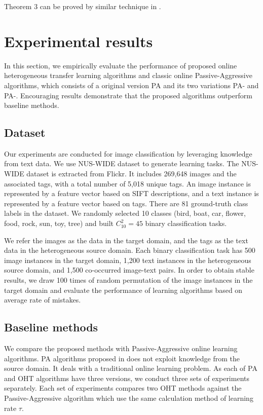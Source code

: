 \documentclass{article} %
\theoremstyle{remark}
\theoremstyle{definition}
\begin{document}
Theorem 3 can be proved by similar technique in \cite{1997decisionFreund}.

\section{Experimental results}

In this section, we empirically evaluate the performance of proposed online heterogeneous transfer learning algorithms and classic online Passive-Aggressive algorithms, which consists of a original version PA and its two variations PA-\uppercase\expandafter{} and PA-\uppercase\expandafter{}.
Encouraging results demonstrate that the proposed algorithms outperform baseline methods.

\subsection{Dataset}
Our experiments are conducted for image classification by leveraging knowledge from text data.
We use NUS-WIDE dataset \cite{nus-wide-civr09} to generate learning tasks.
The NUS-WIDE dataset is extracted from Flickr.
It includes 269,648 images and the associated tags, with a total number of 5,018 unique tags.
An image instance is represented by a feature vector based on SIFT descriptions, and a text instance is represented by a feature vector based on tags.
There are 81 ground-truth class labels in the dataset.
We randomly selected 10 classes (bird, boat, car, flower, food, rock, sun, toy, tree) and built $C_{10}^{2} = 45$ binary classification tasks.

We refer the images as the data in the target domain, and the tags as the text data in the heterogeneous source domain.
Each binary classification task has 500 image instances in the target domain, 1,200 text instances in the heterogeneous source domain, and 1,500 co-occurred image-text pairs.
In order to obtain stable results, we draw 100 times of random permutation of the image instances in the target domain and evaluate the performance of learning algorithms based on average rate of mistakes.

\subsection{Baseline methods}
We compare the proposed methods with Passive-Aggressive online learning algorithms.
PA algorithms proposed in \cite{2006onlineCrammer} does not exploit knowledge from the source domain.
It deals with a traditional online learning problem.
As each of PA and OHT algorithms have three versions, we conduct three sets of experiments separately.
Each set of experiments compares two OHT methods against the Passive-Aggressive algorithm which use the same calculation method of learning rate $\tau$.
\end{document}
